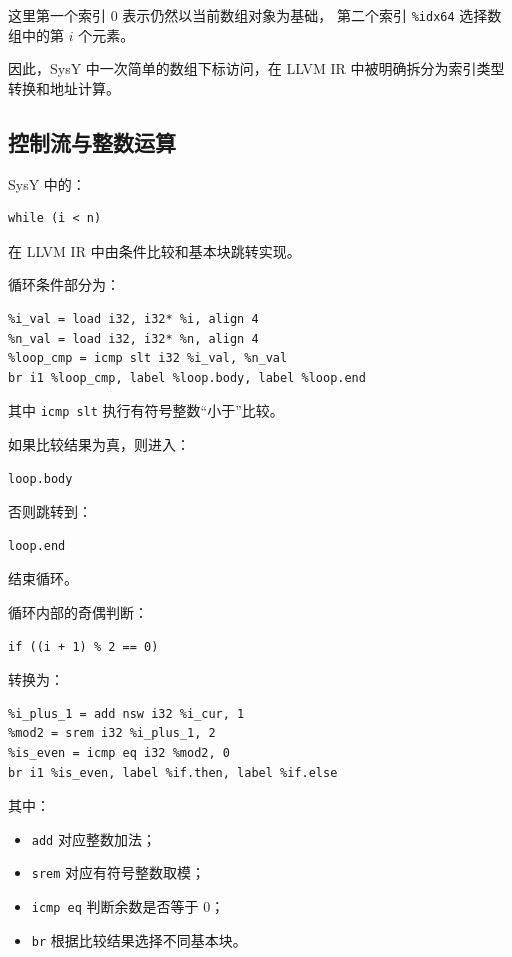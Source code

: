 \documentclass[12pt,a4paper]{ctexart}
\begin{document}
这里第一个索引 0 表示仍然以当前数组对象为基础，
第二个索引 \texttt{\%idx64} 选择数组中的第 $i$ 个元素。

因此，SysY 中一次简单的数组下标访问，在 LLVM IR 中被明确拆分为索引类型转换和地址计算。


\subsection{控制流与整数运算}

SysY 中的：

\begin{lstlisting}
while (i < n)
\end{lstlisting}

在 LLVM IR 中由条件比较和基本块跳转实现。

循环条件部分为：

\begin{lstlisting}
%i_val = load i32, i32* %i, align 4
%n_val = load i32, i32* %n, align 4
%loop_cmp = icmp slt i32 %i_val, %n_val
br i1 %loop_cmp, label %loop.body, label %loop.end
\end{lstlisting}

其中 \texttt{icmp slt} 执行有符号整数“小于”比较。

如果比较结果为真，则进入：

\begin{lstlisting}
loop.body
\end{lstlisting}

否则跳转到：

\begin{lstlisting}
loop.end
\end{lstlisting}

结束循环。

循环内部的奇偶判断：

\begin{lstlisting}
if ((i + 1) % 2 == 0)
\end{lstlisting}

转换为：

\begin{lstlisting}
%i_plus_1 = add nsw i32 %i_cur, 1
%mod2 = srem i32 %i_plus_1, 2
%is_even = icmp eq i32 %mod2, 0
br i1 %is_even, label %if.then, label %if.else
\end{lstlisting}

其中：

\begin{itemize}
    \item \texttt{add} 对应整数加法；
    \item \texttt{srem} 对应有符号整数取模；
    \item \texttt{icmp eq} 判断余数是否等于 0；
    \item \texttt{br} 根据比较结果选择不同基本块。
\end{itemize}
\end{document}
